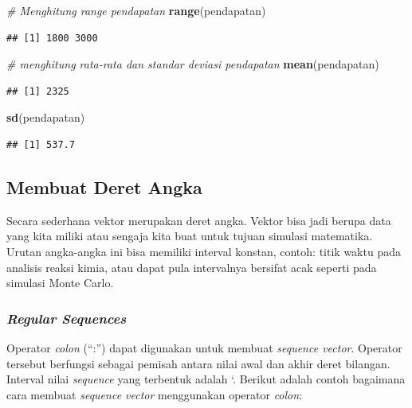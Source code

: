 \documentclass[]{book}
\newenvironment{Shaded}{\begin{snugshade}}{\end{snugshade}}
\newcommand{\CommentTok}[1]{\textcolor[rgb]{0.56,0.35,0.01}{\textit{#1}}}
\newcommand{\KeywordTok}[1]{\textcolor[rgb]{0.13,0.29,0.53}{\textbf{#1}}}
\newcommand{\NormalTok}[1]{#1}
\theoremstyle{definition}
\theoremstyle{definition}
\theoremstyle{definition}
\theoremstyle{remark}
\begin{document}
\begin{Shaded}
\begin{Highlighting}[]
\CommentTok{# Menghitung range pendapatan}
\KeywordTok{range}\NormalTok{(pendapatan)}
\end{Highlighting}
\end{Shaded}

\begin{verbatim}
## [1] 1800 3000
\end{verbatim}

\begin{Shaded}
\begin{Highlighting}[]
\CommentTok{# menghitung rata-rata dan standar deviasi pendapatan}
\KeywordTok{mean}\NormalTok{(pendapatan)}
\end{Highlighting}
\end{Shaded}

\begin{verbatim}
## [1] 2325
\end{verbatim}

\begin{Shaded}
\begin{Highlighting}[]
\KeywordTok{sd}\NormalTok{(pendapatan)}
\end{Highlighting}
\end{Shaded}

\begin{verbatim}
## [1] 537.7
\end{verbatim}

\hypertarget{seq}{%
\subsection{Membuat Deret Angka}\label{seq}}

Secara sederhana vektor merupakan deret angka. Vektor bisa jadi berupa data yang kita miliki atau sengaja kita buat untuk tujuan simulasi matematika. Urutan angka-angka ini bisa memiliki interval konstan, contoh: titik waktu pada analisis reaksi kimia, atau dapat pula intervalnya bersifat acak seperti pada simulasi Monte Carlo.

\hypertarget{regseq}{%
\subsubsection{\texorpdfstring{\emph{Regular Sequences}}{Regular Sequences}}\label{regseq}}

Operator \emph{colon} (``:'') dapat digunakan untuk membuat \emph{sequence vector}. Operator tersebut berfungsi sebagai pemisah antara nilai awal dan akhir deret bilangan. Interval nilai \emph{sequence} yang terbentuk adalah `. Berikut adalah contoh bagaimana cara membuat \emph{sequence vector} menggunakan operator \emph{colon}:
\end{document}
